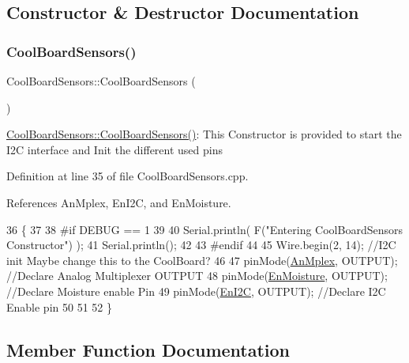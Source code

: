 \subsection{Constructor \& Destructor Documentation}
\mbox{\label{classCoolBoardSensors_a91ff2a02f5486f90cf2413a1cf8a9ed4}} 
\subsubsection{\texorpdfstring{Cool\+Board\+Sensors()}{CoolBoardSensors()}}
{\footnotesize\ttfamily Cool\+Board\+Sensors\+::\+Cool\+Board\+Sensors (\begin{DoxyParamCaption}{ }\end{DoxyParamCaption})}

\hyperlink{classCoolBoardSensors_a91ff2a02f5486f90cf2413a1cf8a9ed4}{Cool\+Board\+Sensors\+::\+Cool\+Board\+Sensors()}\+: This Constructor is provided to start the I2C interface and Init the different used pins 

Definition at line 35 of file Cool\+Board\+Sensors.\+cpp.



References An\+Mplex, En\+I2C, and En\+Moisture.


\begin{DoxyCode}
36 \{
37 
38 \textcolor{preprocessor}{#if DEBUG == 1}
39 
40     Serial.println( F(\textcolor{stringliteral}{"Entering CoolBoardSensors Constructor"}) );
41     Serial.println();
42 
43 \textcolor{preprocessor}{#endif}
44     
45     Wire.begin(2, 14);                       \textcolor{comment}{//I2C init Maybe change this to the CoolBoard?}
46 
47     pinMode(\hyperlink{classCoolBoardSensors_a12ef28b1046219e0aee10bf64e28c4a5}{AnMplex}, OUTPUT);                \textcolor{comment}{//Declare Analog Multiplexer OUTPUT}
48     pinMode(\hyperlink{classCoolBoardSensors_a6177d02e14a057a2f171a2e930b5038d}{EnMoisture}, OUTPUT);             \textcolor{comment}{//Declare Moisture enable Pin}
49     pinMode(\hyperlink{classCoolBoardSensors_aaa6b5dbf3a6633bffd9d204d961096dc}{EnI2C}, OUTPUT);           \textcolor{comment}{//Declare I2C Enable pin }
50 
51 
52 \}
\end{DoxyCode}


\subsection{Member Function Documentation}
\mbox{\label{classCoolBoardSensors_aa432c5aac88f89c31a10766390f23e0b}} 
